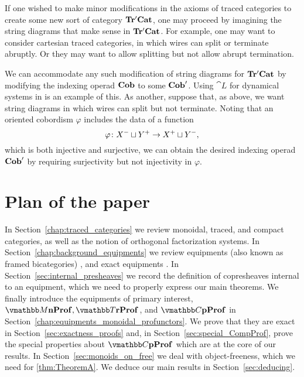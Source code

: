 \documentclass[11pt,oneside,article]{memoir}
\begin{document}
If one wished to make minor modifications in the axioms of traced categories to create some new sort of category $\mathbf{Tr'Cat}$, one may proceed by imagining the string diagrams that make sense in $\mathbf{Tr'Cat}$. For example, one may want to consider cartesian traced categories, in which wires can split or terminate abruptly. Or they may want to allow splitting but not allow abrupt termination. 
\begin{center}
\end{center}
We can accommodate any such modification of string diagrams for $\mathbf{Tr'Cat}$ by modifying the indexing operad $\mathbf{Cob}$ to some $\mathbf{Cob}'$. Using $\cat{L}$ for dynamical systems in \cite{VagnerSpivakLerman} is an example of this. As another, suppose that, as above, we want string diagrams in which wires can split but not terminate. Noting that an oriented cobordism $\varphi$ includes the data of a function
$$\varphi\colon X^-\sqcup Y^+\to X^+\sqcup Y^-,$$ 
which is both injective and surjective, we can obtain the desired indexing operad $\mathbf{Cob}'$ by requiring surjectivity but not injectivity in $\varphi$.


\section{Plan of the paper} 

In Section~\ref{chap:traced_categories} we review monoidal, traced, and compact categories, as well as the notion of orthogonal factorization systems. In Section~\ref{chap:background_equipments} we review equipments (also known as framed bicategories) \cite{Wood} \cite{Shulman}, and exact equipments \cite{Schultz2015}. In Section~\ref{sec:internal_presheaves} we record the definition of copresheaves internal to an equipment, which we need to properly express our main theorems. We finally introduce the equipments of primary interest, $\dMonProf, \dTrProf$, and $\dCompProf$ in Section~\ref{chap:equipments_monoidal_profunctors}. We prove that they are exact in Section~\ref{sec:exactness_proofs} and, in Section~\ref{sec:special_CompProf}, prove the special properties about $\dCompProf$ which are at the core of our results. In Section~\ref{sec:monoids_on_free} we deal with object-freeness, which we need for \ref{thm:TheoremA}. We deduce our main results in Section~\ref{sec:deducing}.
\end{document}
